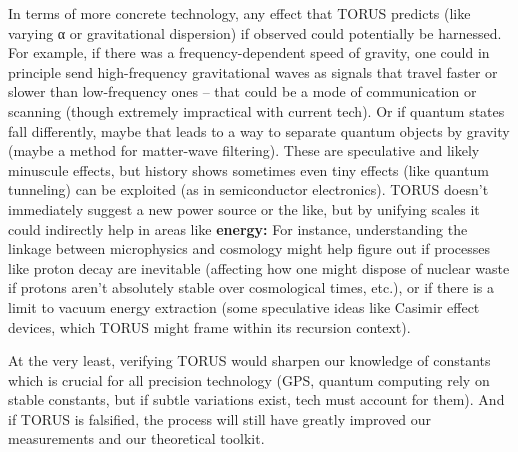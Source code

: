 \documentclass[]{article}
\begin{document}
In terms of more concrete technology, any effect that TORUS predicts
(like varying α or gravitational dispersion) if observed could
potentially be harnessed. For example, if there was a
frequency-dependent speed of gravity, one could in principle send
high-frequency gravitational waves as signals that travel faster or
slower than low-frequency ones -- that could be a mode of communication
or scanning (though extremely impractical with current tech). Or if
quantum states fall differently, maybe that leads to a way to separate
quantum objects by gravity (maybe a method for matter-wave filtering).
These are speculative and likely minuscule effects, but history shows
sometimes even tiny effects (like quantum tunneling) can be exploited
(as in semiconductor electronics). TORUS doesn't immediately suggest a
new power source or the like, but by unifying scales it could indirectly
help in areas like \textbf{energy:} For instance, understanding the
linkage between microphysics and cosmology might help figure out if
processes like proton decay are inevitable (affecting how one might
dispose of nuclear waste if protons aren't absolutely stable over
cosmological times, etc.), or if there is a limit to vacuum energy
extraction (some speculative ideas like Casimir effect devices, which
TORUS might frame within its recursion context).

At the very least, verifying TORUS would sharpen our knowledge of
constants which is crucial for all precision technology (GPS, quantum
computing rely on stable constants, but if subtle variations exist, tech
must account for them). And if TORUS is falsified, the process will
still have greatly improved our measurements and our theoretical
toolkit.
\end{document}
